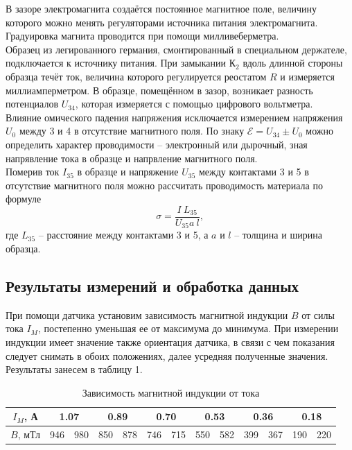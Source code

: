\documentclass[12pt,a4paper]{article}
\begin{document}
В зазоре электромагнита создаётся постоянное магнитное поле, величину которого можно менять регуляторами источника питания электромагнита. Градуировка магнита проводится при помощи милливеберметра.\\
Образец из легированного германия, смонтированный в специальном держателе, подключается к источнику питания. При замыкании К$_2$ вдоль длинной стороны образца течёт ток, величина которого регулируется реостатом $R$ и измеряется миллиамперметром. В образце, помещённом в зазор, возникает разность потенциалов $U_{34}$, которая измеряется с помощью цифрового вольтметра.\\
Влияние омического падения напряжения исключается измерением напряжения $U_0$ между 3 и 4 в отсутствие магнитного поля. По знаку $\mathcal{E} = U_{34} \pm U_0$ можно определить характер проводимости -- электронный или дырочный, зная напрявление тока в образце и напрвление магнитного поля.\\
Померив ток $I_{35}$ в образце и напряжение $U_{35}$ между контактами 3 и 5 в отсутствие магнитного поля можно рассчитать проводимость материала по формуле
$$
\sigma = \frac{I \ L_{35}}{U_{35}a\ l},
$$
где $L_{35}$ -- расстояние между контактами 3 и 5, а $a$ и $l$ -- толщина и ширина образца.

\subsection*{Результаты измерений и обработка данных}
При помощи датчика установим зависимость магнитной индукции $B$ от силы тока $I_M$, постепенно уменьшая ее от максимума до минимума.
При измерении индукции имеет значение также ориентация датчика, в связи с чем показания следует снимать в обоих положениях, далее усредняя полученные значения. 
Результаты занесем в таблицу 1.

\begin{table}[htp]
    \centering
    \begin{tabular}[]{|c|c|c|c|c|c|c|c|c|c|c|c|c|}
        \hline
        $I_M$, А  & \multicolumn{2}{|c|}{1.07} & \multicolumn{2}{|c|}{0.89}  & \multicolumn{2}{|c|}{0.70}  & \multicolumn{2}{|c|}{0.53}  & \multicolumn{2}{|c|}{0.36}  & \multicolumn{2}{|c|}{0.18} \\
        \hline
        $B$, мТл &  946 & 980 & 850 & 878 & 746 & 715 & 550 & 582 & 399 & 367 & 190 & 220\\
        \hline
    \end{tabular}
    \caption{Зависимость магнитной индукции от тока}
\end{table}
\end{document}
